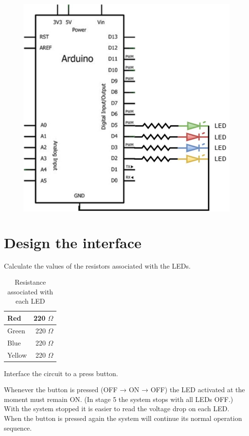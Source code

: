 \documentclass[10pt]{article}
\begin{document}
\begin{figure}[H]
    \centering
    \includegraphics{arduino.jpg}
\end{figure}

\section{Design the interface}

Calculate the values of the resistors associated with the LEDs.

\begin{table}[!h]
    \centering
    \begin{tabular}{l|r}
        Red & 220 $\Omega$ \\ \hline
        Green & 220 $\Omega$ \\ \hline
        Blue & 220 $\Omega$  \\\hline
        Yellow & 220 $\Omega$ \\
    \end{tabular}
    \caption{Resistance associated with each LED}
\end{table}

Interface the circuit to a press button.

Whenever the button is pressed (OFF → ON → OFF) the LED activated at the moment
must remain ON. (In stage 5 the system stops with all LEDs OFF.) With the system
stopped it is easier to read the voltage drop on each LED. When the button is
pressed again the system will continue its normal operation sequence.
\end{document}
